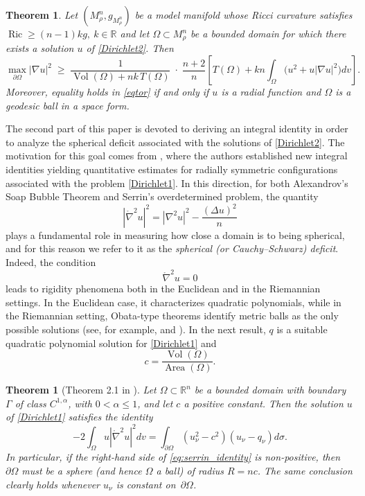 \documentclass[reqno,11pt]{amsart}
\numberwithin{equation}{section}  %
\newtheorem{theorem}{Theorem}[section]
\newtheorem{theoremletter}{Theorem}
\begin{document}
\begin{theoremletter}\label{MainTh_1}
Let $(M_{\rho}^{n},g_{M_{\rho}^{n}})$ be a model manifold whose Ricci curvature satisfies $\operatorname{Ric} \geq (n-1)k g, \ k\in\mathbb{R}$ and let $\Omega \subset M_{\rho}^{n}$ be a bounded domain for which there exists a solution $u$ of \eqref{Dirichlet2}. Then
\begin{equation}\label{eqtor}
\max_{\partial\Omega}|\nabla u|^2 \;\geq\; \frac{1}{\operatorname{Vol}(\Omega) + nk\,T(\Omega)}\;\cdot\;\frac{n+2}{n}\left[ T(\Omega) + kn\int_{\Omega}\bigl(u^2 + u|\nabla u|^2\bigr)dv \right].
\end{equation}
Moreover, equality holds in \eqref{eqtor} if and only if $u$ is a radial function and $\Omega$ is a geodesic ball in a space form.
\end{theoremletter}

The second part of this paper is devoted to deriving an integral identity in order to analyze the spherical deficit associated with the solutions of \eqref{Dirichlet2}. The motivation for this goal comes from \cite{poggesi,poggesi1}, where the authors established new integral identities yielding quantitative estimates for radially symmetric configurations associated with the problem \eqref{Dirichlet1}. In this direction, for both Alexandrov's Soap Bubble Theorem and Serrin's overdetermined problem, the quantity
\[
|\mathring{\nabla}^{2}u|^{2}
=
|\nabla^{2}u|^{2}
-
\frac{(\Delta u)^{2}}{n}
\]
plays a fundamental role in measuring how close a domain is to being spherical, and for this reason we refer to it as the \textit{spherical (or Cauchy--Schwarz) deficit}. Indeed, the condition
\[
\mathring{\nabla}^{2}u=0
\]
leads to rigidity phenomena both in the Euclidean and in the Riemannian settings. In the Euclidean case, it characterizes quadratic polynomials, while in the Riemannian setting, Obata-type theorems identify metric balls as the only possible solutions (see, for example, \cite{obata, reilly} and \cite[Lemma 6]{farina2022}). In the next result, $q$ is a suitable quadratic polynomial solution for \eqref{Dirichlet1} and
$$c=\frac{\operatorname{Vol}(\Omega)}{\operatorname{Area}(\Omega)}.$$

\begin{theorem}[Theorem 2.1 in \cite{poggesi}]
Let $\Omega \subset \mathbb{R}^{n}$ be a bounded domain with boundary $\Gamma$ of class $C^{1,\alpha}$, with $0<\alpha\leq 1$, and let $c$ a positive constant. Then the solution $u$ of \eqref{Dirichlet1} satisfies the identity
\begin{equation}\label{eq:serrin_identity}
-2\int_{\Omega} u|\mathring{\nabla}^{2}u|^2dv
=\int_{\partial\Omega}(u_{\nu}^{2}-c^{2})(u_{\nu}-q_{\nu})d\sigma.
\end{equation}
In particular, if the right-hand side of \eqref{eq:serrin_identity} is non-positive, then $\partial\Omega$ must be a sphere (and hence $\Omega$ a ball) of radius $R=nc$. The same conclusion clearly holds whenever $u_{\nu}$ is constant on~$\partial\Omega$.
\end{theorem}
\end{document}
